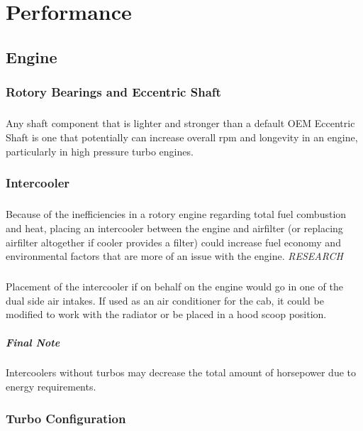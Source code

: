 \documentclass[a4paper,10pt]{report}
\begin{document}
\chapter{Performance}
\section{Engine}
\subsection{Rotory Bearings and Eccentric Shaft} 
\paragraph*{}Any shaft component that is lighter and stronger than a default OEM Eccentric Shaft is one that potentially can increase overall rpm and longevity in an engine, particularly in high pressure turbo engines.
\subsection{Intercooler} 
\paragraph*{}Because of the inefficiencies in a rotory engine regarding total fuel combustion and heat, placing an intercooler between the engine and airfilter (or replacing airfilter altogether if cooler provides a filter) could increase fuel economy and environmental factors that are more of an issue with the engine. \textit{RESEARCH}
\paragraph*{}Placement of the intercooler if on behalf on the engine would go in one of the dual side air intakes. If used as an air conditioner for the cab, it could be modified to work with the radiator or be placed in a hood scoop position.
\paragraph*{Final Note} Intercoolers without turbos may decrease the total amount of horsepower due to energy requirements.
\subsection{Turbo Configuration} 
\end{document}
